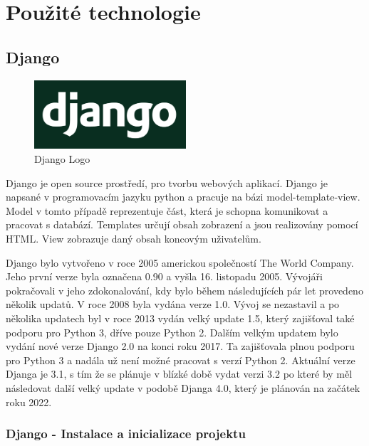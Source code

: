 \chapter{Použité technologie}
\label{2-technologie}

\section{Django}

\begin{figure}[H] \centering
    \includegraphics[width=160pt]{./pictures/django-logo.png}
    \caption[Django Logo]{Django Logo \cite{}}
	\label{fig:Django Logo}                                
\end{figure}

Django je open source prostředí, pro tvorbu webových aplikací. Django
je napsané v programovacím jazyku python a pracuje na bázi
model-template-view. Model v tomto případě reprezentuje část, která je
schopna komunikovat a pracovat s databází. Templates určují obsah
zobrazení a jsou realizovány pomocí HTML. View zobrazuje daný obsah
koncovým uživatelům.

Django bylo vytvořeno v roce 2005 americkou společností The World
Company. Jeho první verze byla označena 0.90 a vyšla 16. listopadu
2005. Vývojáři pokračovali v jeho zdokonalování, kdy bylo během
následujících pár let provedeno několik updatů. V roce 2008 byla
vydána verze 1.0. Vývoj se nezastavil a po několika updatech byl v
roce 2013 vydán velký update 1.5, který zajišťoval také podporu pro
Python 3, dříve pouze Python 2. Dalším velkým updatem bylo vydání nové
verze Django 2.0 na konci roku 2017. Ta zajišťovala plnou podporu pro
Python 3 a nadála už není možné pracovat s verzí Python 2. Aktuální
verze Djanga je 3.1, s tím že se plánuje v blízké době vydat verzi 3.2
po které by měl následovat další velký update v podobě Djanga 4.0,
který je plánován na začátek roku 2022.

\newpage


\subsection{Django - Instalace a inicializace projektu}

